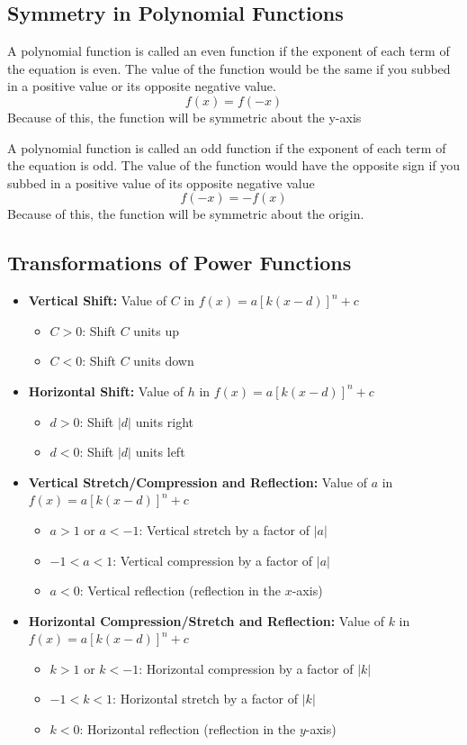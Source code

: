 \documentclass{article}
\begin{document}
\subsection{Symmetry in Polynomial Functions}
A polynomial function is called an even function if the exponent of each term of the equation is even. The value of the function would be the same if you subbed in a positive value or its opposite negative value.
$$f(x) = f(-x)$$ Because of this, the function will be symmetric about the y-axis

A polynomial function is called an odd function if the exponent of each term of the equation is odd. The value of the function would have the opposite sign if you
subbed in a positive value of its opposite negative value
$$f(-x) = -f(x)$$
Because of this, the function will be symmetric about the origin. 
\subsection{Transformations of Power Functions}
\begin{itemize}
    \item \textbf{Vertical Shift:} Value of $C$ in $f(x) = a[k(x - d)]^n + c$
    \begin{itemize}
        \item $C > 0$: Shift $C$ units up
        \item $C < 0$: Shift $C$ units down
    \end{itemize}
    
    \item \textbf{Horizontal Shift:} Value of $h$ in $f(x) = a[k(x - d)]^n + c$
    \begin{itemize}
        \item $d > 0$: Shift $|d|$ units right
        \item $d < 0$: Shift $|d|$ units left
    \end{itemize}
    
    \item \textbf{Vertical Stretch/Compression and Reflection:} Value of $a$ in $f(x) = a[k(x - d)]^n + c$
    \begin{itemize}
        \item $a > 1$ or $a < -1$: Vertical stretch by a factor of $|a|$
        \item $-1 < a < 1$: Vertical compression by a factor of $|a|$
        \item $a < 0$: Vertical reflection (reflection in the $x$-axis)
    \end{itemize}
    
    \item \textbf{Horizontal Compression/Stretch and Reflection:} Value of $k$ in $f(x) = a[k(x - d)]^n + c$
    \begin{itemize}
        \item $k > 1$ or $k < -1$: Horizontal compression by a factor of $|k|$
        \item $-1 < k < 1$: Horizontal stretch by a factor of $|k|$
        \item $k < 0$: Horizontal reflection (reflection in the $y$-axis)
    \end{itemize}
\end{itemize}
\end{document}
